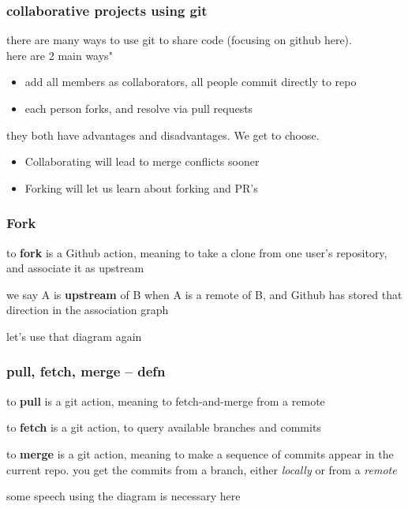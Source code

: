 \documentclass[14pt,aspectratio=1610]{beamer} %
\newcommand{\fframe}[2]{
   \begin{frame}
\frametitle{#1}
#2
\end{frame}
}
\begin{document}
\fframe{collaborative projects using git}
{
	there are many ways to use git to share code (focusing on github here).  \\here are 2 main ways"

\vspace{\baselineskip}
	\begin{itemize}
	\item add all members as collaborators, all people commit directly to repo
	\item each person forks, and resolve via pull requests
\end{itemize}

\vspace{\baselineskip}

they both have advantages and disadvantages.  We get to choose.  
	\begin{itemize}
	\item Collaborating will lead to merge conflicts sooner
	\item Forking will let us learn about forking and PR's
\end{itemize}
}




\fframe{Fork}
{
	\begin{definition}
to {\bf fork} is a Github action, meaning to take a clone from one user's repository, and associate it as upstream
	\end{definition}

	\begin{definition}
we say A is {\bf upstream} of B when A is a remote of B, and Github has stored that direction in the association graph
	\end{definition}

	let's use that diagram again
}










\fframe{pull, fetch, merge -- defn}
{
\begin{definition}
to {\bf pull} is a git action, meaning to fetch-and-merge from a remote
	\end{definition}

	\begin{definition}
to {\bf fetch} is a git action, to query available branches and commits
	\end{definition}

\begin{definition}
to {\bf merge} is a git action, meaning to make a sequence of commits appear in the current repo.  you get the commits from a branch, either {\em locally} or from a {\em remote}
	\end{definition}

	some speech using the diagram is necessary here
}
\end{document}
